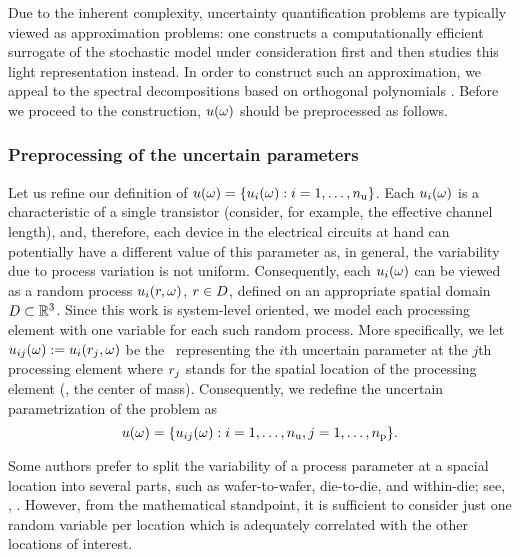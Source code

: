 Due to the inherent complexity, uncertainty quantification problems are typically viewed as approximation problems: one constructs a computationally efficient surrogate of the stochastic model under consideration first and then studies this light representation instead.
In order to construct such an approximation, we appeal to the spectral decompositions based on orthogonal polynomials \cite{maitre2010, janson1997, eldred2008}.
Before we proceed to the construction, $u(\omega)$ should be preprocessed as follows.

\subsubsection{Preprocessing of the uncertain parameters} 
Let us refine our definition of $u(\omega) = \{ u_i(\omega): i = 1, \dots, {n_\text{u}} \}$.
Each $u_i(\omega)$ is a characteristic of a single transistor (consider, for example, the effective channel length), and, therefore, each device in the electrical circuits at hand can potentially have a different value of this parameter as, in general, the variability due to process variation is not uniform.
Consequently, each $u_i(\omega)$ can be viewed as a random process $u_i(r, \omega)$, $r \in D$, defined on an appropriate spatial domain $D \subset \mathbb{R}^3$.
Since this work is system-level oriented, we model each processing element with one variable for each such random process.
More specifically, we let $u_{ij}(\omega) := u_i(r_j, \omega)$ be the \rv\ representing the $i$th uncertain parameter at the $j$th processing element where $r_j$ stands for the spatial location of the processing element (\eg, the center of mass).
Consequently, we redefine the uncertain parametrization of the problem as
\begin{equation} \elab{uncertain-parameters}
  \u(\o) = \{ \u_{ij}(\o): i = 1, \dots, \nparams, j = 1, \dots, \nprocs \}.
\end{equation}
\begin{remark}
Some authors prefer to split the variability of a process parameter at a spacial location into several parts, such as wafer-to-wafer, die-to-die, and within-die; see, \eg, \cite{juan2012}.
However, from the mathematical standpoint, it is sufficient to consider just one random variable per location which is adequately correlated with the other locations of interest.
\end{remark}

